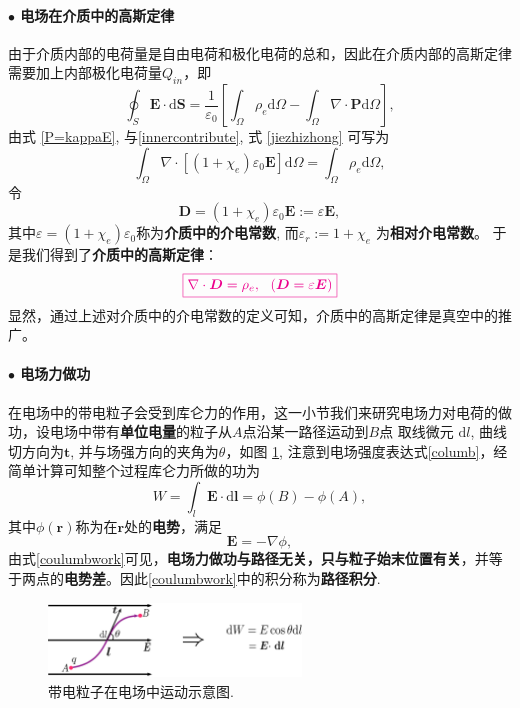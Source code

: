 \documentclass[10pt,reqno, final]{ctexart}
\begin{document}
\paragraph{$\bullet$ 电场在介质中的高斯定律} 由于介质内部的电荷量是自由电荷和极化电荷的总和，因此在介质内部的高斯定律需要加上内部极化电荷量$Q_{in}$，即
\begin{equation}\label{jiezhizhong}
\oint_S \bm{E}\cdot \mathrm{d}\bm{S} = \frac{1}{\varepsilon_0}\left[ \int_\Omega \rho_e \mathrm{d}\Omega-\int_\Omega \nabla\cdot\bm{P} \mathrm{d}\Omega \right],
\end{equation} 
由式 	\eqref{P=kappaE}, 与\eqref{innercontribute}, 式	\eqref{jiezhizhong} 可写为
\begin{equation}
\int_{\Omega} \nabla\cdot[(1+\chi_e)\varepsilon_0\bm{E}]\mathrm{d}\Omega = \int_\Omega \rho_e \mathrm{d}\Omega,
\end{equation}
令 
$$\bm{D} = (1+\chi_e)\varepsilon_0\bm{E}:= \varepsilon \bm{E},$$
其中$\varepsilon=(1+\chi_e)\varepsilon_0$称为\textbf{介质中的介电常数}, 而$\varepsilon_r:=1+\chi_e$ 为\textbf{相对介电常数}。
于是我们得到了\textbf{介质中的高斯定律}：
\begin{equation}\label{gaussThmgeneral}
\color{magenta}{\boxed{\nabla\cdot \bm{D} = \rho_e ,\ \  (\bm{D}=\varepsilon \bm{E})}} 
\end{equation}
显然，通过上述对介质中的介电常数的定义可知，介质中的高斯定律是真空中的推广。


\paragraph{$\bullet$ 电场力做功} 在电场中的带电粒子会受到库仑力的作用，这一小节我们来研究电场力对电荷的做功，设电场中带有\textbf{单位电量}的粒子从$A$点沿某一路径运动到$B$点 取线微元 $\mathrm{d}l$, 曲线切方向为$\bm{t}$, 并与场强方向的夹角为$\theta$，如图 \ref{dianchanglizuogong}, 注意到电场强度表达式\eqref{columb}，经简单计算可知整个过程库仑力所做的功为
\begin{equation}\label{coulumbwork}
W = \int_{l}\bm{E}\cdot\mathrm{d}\bm{l} = \phi(B) - \phi(A),
\end{equation}
其中$\phi(\bm{r})$称为在$\bm{r}$处的\textbf{电势}，满足
$$ \bm{E} = -\nabla\phi, $$
由式\eqref{coulumbwork}可见，\textbf{电场力做功与路径无关，只与粒子始末位置有关}，并等于两点的\textbf{电势差}。因此\eqref{coulumbwork}中的积分称为\textbf{路径积分}. 

\begin{figure}[htp]
	\centering
	\includegraphics[width=0.6\textwidth]{Figures/dianchanglizuogong}
	\caption {带电粒子在电场中运动示意图. }
	\label{dianchanglizuogong}
\end{figure}
\end{document}
